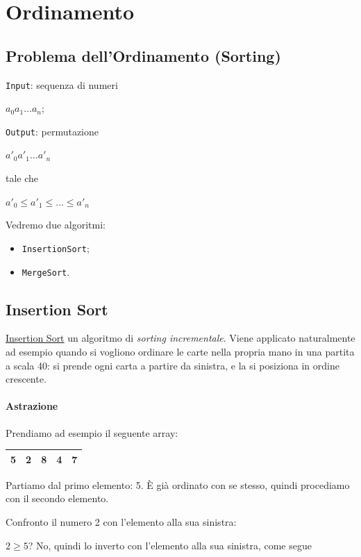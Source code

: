 \pagebreak
	
\section{Ordinamento}

\subsection{Problema dell'Ordinamento (Sorting)}
\texttt{Input}: sequenza di numeri 
\begin{center}
	$a_0 a_1 \dots a_n$;\par
\end{center}
\texttt{Output}: permutazione
\begin{center}
	$a'_0 a'_1 \dots a'_n$
\end{center}
tale che 
\begin{center}
	$a'_0 \leq a'_1 \leq \dots \leq a'_n$
\end{center}

\noindent Vedremo due algoritmi:
\begin{itemize}[noitemsep]
	\item \texttt{InsertionSort};
	\item \texttt{MergeSort}.
\end{itemize}

\subsection{Insertion Sort} \label{insertionsort}
\href{https://en.wikipedia.org/wiki/Insertion_sort}{Insertion Sort} un algoritmo di \emph{sorting incrementale}. Viene applicato naturalmente ad esempio quando si vogliono ordinare le carte nella propria mano in una partita a scala 40: si prende ogni carta a partire da sinistra, e la si posiziona in ordine crescente.\par
\paragraph{Astrazione} Prendiamo ad esempio il seguente array:

\begin{center}
	\begin{tabular}{|l|l|l|l|l|}
		\hline
		5 & 2 & 8 & 4 & 7 \\
		\hline
	\end{tabular}
\end{center}

\noindent Partiamo dal primo elemento: 5. È già ordinato con se stesso, quindi procediamo con il secondo elemento.\par
\noindent Confronto il numero 2 con l'elemento alla sua sinistra: \par
$2 \geq 5$?  No, quindi lo inverto con l'elemento alla sua sinistra, come segue

